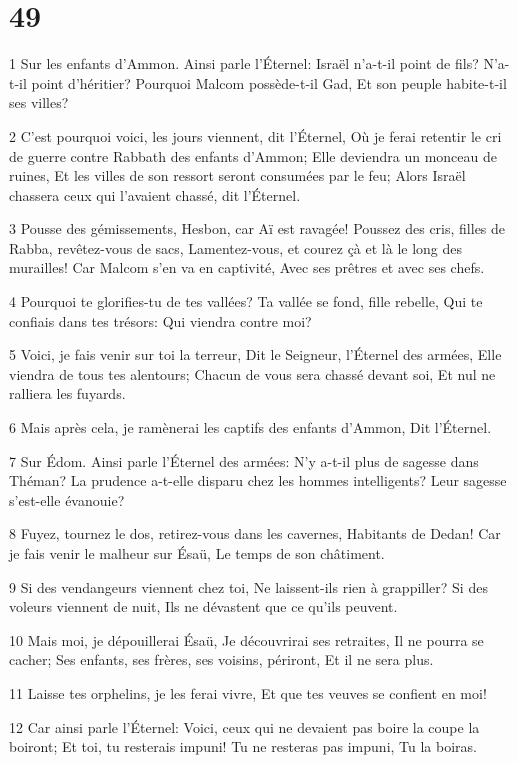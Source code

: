 \chapter{49}

\par 1 Sur les enfants d'Ammon. Ainsi parle l'Éternel: Israël n'a-t-il point de fils? N'a-t-il point d'héritier? Pourquoi Malcom possède-t-il Gad, Et son peuple habite-t-il ses villes?
\par 2 C'est pourquoi voici, les jours viennent, dit l'Éternel, Où je ferai retentir le cri de guerre contre Rabbath des enfants d'Ammon; Elle deviendra un monceau de ruines, Et les villes de son ressort seront consumées par le feu; Alors Israël chassera ceux qui l'avaient chassé, dit l'Éternel.
\par 3 Pousse des gémissements, Hesbon, car Aï est ravagée! Poussez des cris, filles de Rabba, revêtez-vous de sacs, Lamentez-vous, et courez çà et là le long des murailles! Car Malcom s'en va en captivité, Avec ses prêtres et avec ses chefs.
\par 4 Pourquoi te glorifies-tu de tes vallées? Ta vallée se fond, fille rebelle, Qui te confiais dans tes trésors: Qui viendra contre moi?
\par 5 Voici, je fais venir sur toi la terreur, Dit le Seigneur, l'Éternel des armées, Elle viendra de tous tes alentours; Chacun de vous sera chassé devant soi, Et nul ne ralliera les fuyards.
\par 6 Mais après cela, je ramènerai les captifs des enfants d'Ammon, Dit l'Éternel.
\par 7 Sur Édom. Ainsi parle l'Éternel des armées: N'y a-t-il plus de sagesse dans Théman? La prudence a-t-elle disparu chez les hommes intelligents? Leur sagesse s'est-elle évanouie?
\par 8 Fuyez, tournez le dos, retirez-vous dans les cavernes, Habitants de Dedan! Car je fais venir le malheur sur Ésaü, Le temps de son châtiment.
\par 9 Si des vendangeurs viennent chez toi, Ne laissent-ils rien à grappiller? Si des voleurs viennent de nuit, Ils ne dévastent que ce qu'ils peuvent.
\par 10 Mais moi, je dépouillerai Ésaü, Je découvrirai ses retraites, Il ne pourra se cacher; Ses enfants, ses frères, ses voisins, périront, Et il ne sera plus.
\par 11 Laisse tes orphelins, je les ferai vivre, Et que tes veuves se confient en moi!
\par 12 Car ainsi parle l'Éternel: Voici, ceux qui ne devaient pas boire la coupe la boiront; Et toi, tu resterais impuni! Tu ne resteras pas impuni, Tu la boiras.
